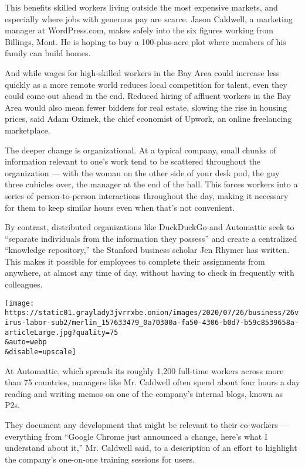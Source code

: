 This benefits skilled workers living outside the most expensive markets,
and especially where jobs with generous pay are scarce. Jason Caldwell,
a marketing manager at WordPress.com, makes safely into the six figures
working from Billings, Mont. He is hoping to buy a 100-plus-acre plot
where members of his family can build homes.

And while wages for high-skilled workers in the Bay Area could increase
less quickly as a more remote world reduces local competition for
talent, even they could come out ahead in the end. Reduced hiring of
affluent workers in the Bay Area would also mean fewer bidders for real
estate, slowing the rise in housing prices, said Adam Ozimek, the chief
economist of Upwork, an online freelancing marketplace.

The deeper change is organizational. At a typical company, small chunks
of information relevant to one's work tend to be scattered throughout
the organization --- with the woman on the other side of your desk pod,
the guy three cubicles over, the manager at the end of the hall. This
forces workers into a series of person-to-person interactions throughout
the day, making it necessary for them to keep similar hours even when
that's not convenient.

By contrast, distributed organizations like DuckDuckGo and Automattic
seek to ``separate individuals from the information they possess'' and
create a centralized ``knowledge repository,'' the Stanford business
scholar Jen Rhymer has written. This makes it possible for employees to
complete their assignments from anywhere, at almost any time of day,
without having to check in frequently with colleagues.

\texttt{[image: https://static01.graylady3jvrrxbe.onion/images/2020/07/26/business/26virus-labor-sub2/merlin\_157633479\_0a70300a-fa50-4306-b0d7-b59c8539658a-articleLarge.jpg?quality=75\\\&auto=webp\\\&disable=upscale]}

At Automattic, which spreads its roughly 1,200 full-time workers across
more than 75 countries, managers like Mr. Caldwell often spend about
four hours a day reading and writing memos on one of the company's
internal blogs, known as P2s.

They document any development that might be relevant to their co-workers
--- everything from ``Google Chrome just announced a change, here's what
I understand about it,'' Mr. Caldwell said, to a description of an
effort to highlight the company's one-on-one training sessions for
users.

